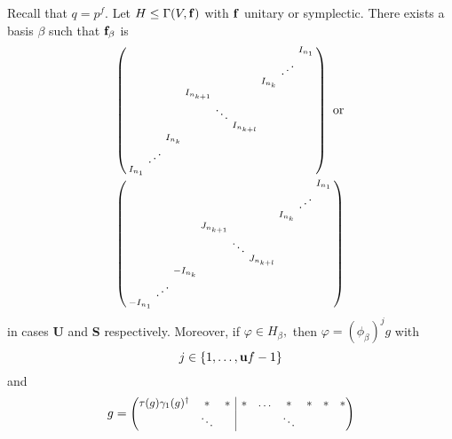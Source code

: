\begin{Lem}\label{unist}
Recall that $q=p^f.$ Let $H \le \Gamma(V, {\bf f})$ with ${\bf f}$ unitary or symplectic. There exists a basis $\beta$ such that 
${\bf f}_{\beta}$ is
\begin{equation}\label{fst}
\begin{aligned}
& \left(
\begin{smallmatrix}
        & & & & & & &    & I_{n_1} \\
        & & & & & & &  \reflectbox{$\ddots$}  &\\
        & & & & & &I_{n_k} &    & \\
        & & &I_{n_{k+1}} & & & &    &\\ 
        & & & &\ddots & & &    &\\
        & & & & &I_{n_{k+l}} & &    &\\ 
        & &I_{n_k} & & & & &    & \\
        &\reflectbox{$\ddots$} & & & & & &    &\\
I_{n_1} & & & & & & &    & 
\end{smallmatrix} \right)  \text{ or } \\
 & \left(
\begin{smallmatrix}
        & & & & & & &    & I_{n_1} \\
        & & & & & & &  \reflectbox{$\ddots$}  &\\
        & & & & & &I_{n_k} &    & \\
        & & &J_{n_{k+1}} & & & &    &\\ 
        & & & &\ddots & & &    &\\
        & & & & &J_{n_{k+l}} & &    &\\ 
        & &-I_{n_k} & & & & &    & \\
        &\reflectbox{$\ddots$} & & & & & &    &\\
-I_{n_1} & & & & & & &    & 
\end{smallmatrix} \right) 
\end{aligned}
\end{equation}
 in cases {\bf U} and {\bf S} respectively. Moreover, if $\varphi \in H_{\beta},$ then $\varphi=({\phi_{\beta}})^j g$ with $$j \in \{1, \ldots, {\bf u}f-1\}$$ and 
\begin{equation}\label{gst}
g=\Scale[0.9]{ \begin{pmatrix}
{\tau(g)\gamma_{1}(g)^{\dagger}}&* &\multicolumn{1}{l|}{*} &* & \ldots & *&* &*    &*  \\
        & \ddots &\multicolumn{1}{l|}{} & & &\ddots & &    &\\

\end{pmatrix}}
\end{equation}
\end{Lem}
